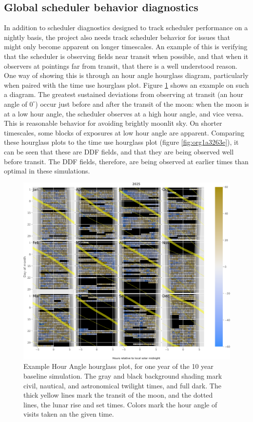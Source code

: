 \subsection{Global scheduler behavior diagnostics}
\label{sec:orgdafac3c}
In addition to scheduler diagnostics designed to track scheduler performance on a nightly basis, the project also needs track scheduler behavior for issues that might only become apparent on longer timescales.
An example of this is verifying that the scheduler is observing fields near transit when possible, and that when it observers at pointings far from transit, that there is a well understood reason.
One way of showing this is through an hour angle hourglass diagram, particularly when paired with the time use hourglass plot.
Figure \ref{fig:orgef69f9e} shows an example on such a diagram.
The greatest sustained deviations from observing at transit (an hour angle of \(0^{\circ}\)) occur just before and after the transit of the moon: when the moon is at a low hour angle, the scheduler observes at a high hour angle, and vice versa.
This is reasonable behavior for avoiding brightly moonlit sky.
On shorter timescales, some blocks of exposures at low hour angle are apparent.
Comparing these hourglass plots to the time use hourglass plot (figure \ref{fig:org1a3263e}), it can be seen that these are DDF fields, and that they are being observed well before transit.
The DDF fields, therefore, are being observed at earlier times than optimal in these simulations.

\begin{figure}[htbp]
\centering
\includegraphics[width=1.0\textwidth]{./figures/hour_angle_hourglass.png}
\caption{\label{fig:orgef69f9e}Example Hour Angle hourglass plot, for one year of the 10 year baseline simulation. The gray and black background shading mark civil, nautical, and astronomical twilight times, and full dark. The thick yellow lines mark the transit of the moon, and the dotted lines, the lunar rise and set times. Colors mark the hour angle of visits taken an the given time.}
\end{figure}


